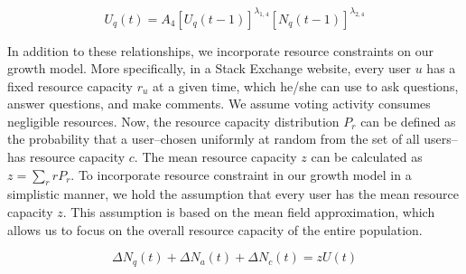\documentclass{sig-alternate-10pt}
\begin{document}
    \begin{equation}
    U_q(t) = A_4 [U_q(t-1)]^{\lambda_{1, 4}} [N_q(t-1)]^{\lambda_{2, 4}} 
    \end{equation}

\noindent In addition to these relationships, we incorporate resource constraints on our growth model. More specifically, in a Stack Exchange website, every user $u$ has a fixed resource capacity $r_u$ at a given time, which he/she can use to ask questions, answer questions, and make comments. We assume voting activity consumes negligible resources. Now, the resource capacity distribution $P_r$ can be defined as the probability that a user--chosen uniformly at random from the set of all users--has resource capacity $c$. The mean resource capacity $z$ can be calculated as $z = \sum_{r}{rP_r}$. To incorporate resource constraint in our growth model in a simplistic manner, we hold the assumption that every user has the mean resource capacity $z$. This assumption is based on the mean field approximation, which allows us to focus on the overall resource capacity of the entire population. 

\begin{equation}
\Delta N_q(t) + \Delta N_a(t) + \Delta N_c(t) = zU(t)
\end{equation}


%

\end{document}
